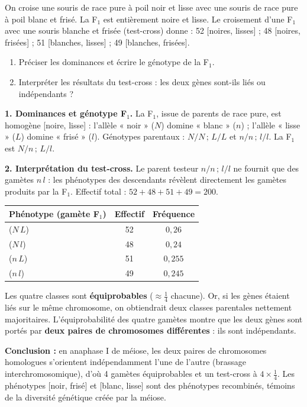 \documentclass[11pt]{article}
\newcommand{\cle}[1]{{\popxbold\color{popdark}#1}}
\begin{document}
\begin{exoresolu}
On croise une souris de race pure à poil noir et lisse avec une souris de race pure à poil blanc et frisé. La F$_1$ est entièrement noire et lisse. Le croisement d'une F$_1$ avec une souris blanche et frisée (test-cross) donne : 52 [noires, lisses] ; 48 [noires, frisées] ; 51 [blanches, lisses] ; 49 [blanches, frisées].
\begin{enumerate}
\item Préciser les dominances et écrire le génotype de la F$_1$.
\item Interpréter les résultats du test-cross : les deux gènes sont-ils liés ou indépendants ?
\end{enumerate}
\tcblower
\textbf{1. Dominances et génotype F$_1$.} La F$_1$, issue de parents de race pure, est homogène [noire, lisse] : l'allèle « noir » ($N$) domine « blanc » ($n$) ; l'allèle « lisse » ($L$) domine « frisé » ($l$). Génotypes parentaux : $N/N\,;\,L/L$ et $n/n\,;\,l/l$. La F$_1$ est $N/n\,;\,L/l$.

\textbf{2. Interprétation du test-cross.} Le parent testeur $n/n\,;\,l/l$ ne fournit que des gamètes $n\,l$ : les phénotypes des descendants révèlent directement les gamètes produits par la F$_1$. Effectif total : $52+48+51+49 = 200$.
\begin{center}
\begin{tabular}{|l|c|c|}
\hline
\rowcolor{popblueL} Phénotype (gamète F$_1$) & Effectif & Fréquence \\
\hline
[noir, lisse] ($N\,L$) & 52 & $0{,}26$ \\
\hline
[noir, frisé] ($N\,l$) & 48 & $0{,}24$ \\
\hline
[blanc, lisse] ($n\,L$) & 51 & $0{,}255$ \\
\hline
[blanc, frisé] ($n\,l$) & 49 & $0{,}245$ \\
\hline
\end{tabular}
\end{center}
Les quatre classes sont \textbf{équiprobables} ($\approx \frac{1}{4}$ chacune). Or, si les gènes étaient liés sur le même chromosome, on obtiendrait deux classes parentales nettement majoritaires. L'équiprobabilité des quatre gamètes montre que les deux gènes sont portés par \textbf{deux paires de chromosomes différentes} : ils sont \cle{indépendants}.

\textbf{Conclusion :} en anaphase I de méiose, les deux paires de chromosomes homologues s'orientent indépendamment l'une de l'autre (brassage interchromosomique), d'où 4 gamètes équiprobables et un test-cross à $4 \times \frac{1}{4}$. Les phénotypes [noir, frisé] et [blanc, lisse] sont des phénotypes \cle{recombinés}, témoins de la diversité génétique créée par la méiose.
\end{exoresolu}
\end{document}
